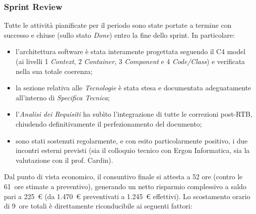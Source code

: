 \documentclass[a4paper, 11pt, oneside]{scrartcl} %
\begin{document}
\subsubsection*{Sprint Review}

Tutte le attività pianificate per il periodo sono state portate a termine con successo e chiuse (sullo stato \textit{Done}) entro la fine dello sprint. In particolare:
\begin{itemize}[noitemsep, topsep=2pt]
  \item l'architettura software è stata interamente progettata seguendo il C4 model (ai livelli 1 \textit{Context}, 2 \textit{Container}, 3 \textit{Component} e 4 \textit{Code/Class}) e verificata nella sua totale coerenza;
  \item la sezione relativa alle \textit{Tecnologie} è stata stesa e documentata adeguatamente all'interno di \textit{Specifica Tecnica};
  \item l'\textit{Analisi dei Requisiti} ha subìto l'integrazione di tutte le correzioni post-RTB, chiudendo definitivamente il perfezionamento del documento;
  \item sono stati sostenuti regolarmente, e con esito particolarmente positivo, i due incontri esterni previsti (sia il colloquio tecnico con Ergon Informatica, sia la valutazione con il prof. Cardin).
\end{itemize}
Dal punto di vista economico, il consuntivo finale si attesta a 52 ore (contro le 61~ore stimate a preventivo), generando un netto risparmio complessivo a saldo pari a 225~€ (da 1.470~€ preventivati a 1.245~€ effettivi). Lo scostamento orario di 9~ore totali è direttamente riconducibile ai seguenti fattori:
\end{document}
